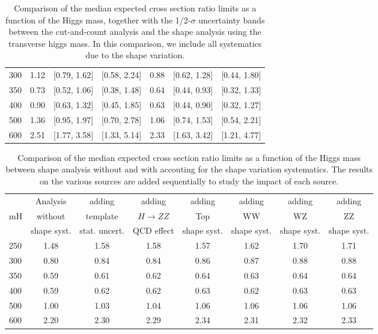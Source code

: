 \begin{table}[!ht]
\begin{center}
{\begin{tabular}{|l|c|c|c|c|c|c|}
300 & 1.12 & [0.79, 1.62] & [0.58, 2.24] & 0.88 & [0.62, 1.28] & [0.44, 1.80] \\
350 & 0.73 & [0.52, 1.06] & [0.38, 1.48] & 0.64 & [0.44, 0.93] & [0.32, 1.33] \\
400 & 0.90 & [0.63, 1.32] & [0.45, 1.85] & 0.63 & [0.44, 0.90] & [0.32, 1.27] \\
500 & 1.36 & [0.95, 1.97] & [0.70, 2.78] & 1.06 & [0.74, 1.53] & [0.54, 2.21]\\
600 & 2.51 & [1.77, 3.58] & [1.33, 5.14] & 2.33 & [1.63, 3.42] & [1.21, 4.77]\\
\hline
\end{tabular}
}
\caption{Comparison of the median expected cross section ratio limits as a function 
of the Higgs mass, together with the 1/2-$\sigma$ uncertainty bands between the cut-and-count 
analysis and the shape analysis using the transverse higgs mass. In this comparison, we include all systematics due to 
the shape variation. }
\label{tab:mva_mtshapevscuts_withshapevar_hzz}
\end{center}
\end{table}
\begin{table}[!ht]
\begin{center}
{\normalsize
\begin{tabular}{|l|c|cccccc|}
\hline
      &  Analysis    & adding          &  adding      &  adding      &  adding      & adding      & adding \\
mH  &  without     & template        &  $H\to ZZ$   &  Top         &  WW          & WZ          & ZZ \\
      &  shape syst. & stat. uncert.   &  QCD effect &  shape syst. &  shape syst. & shape syst. & shape syst. \\
\hline
250 & 1.48 & 1.58 & 1.58 & 1.57 & 1.62 & 1.70 & 1.71 \\
300 & 0.80 & 0.84 & 0.84 & 0.86 & 0.87 & 0.88 & 0.88 \\
350 & 0.59 & 0.61 & 0.62 & 0.64 & 0.63 & 0.64 & 0.64 \\
400 & 0.59 & 0.62 & 0.62 & 0.63 & 0.62 & 0.63 & 0.63 \\
500 & 1.00 & 1.03 & 1.04 & 1.06 & 1.06 & 1.06 & 1.06 \\
600 & 2.20 & 2.30 & 2.29 & 2.34 & 2.31 & 2.32 & 2.33 \\
\hline
\end{tabular}
}
\caption{Comparison of the median expected cross section ratio limits as a function 
of the Higgs mass between shape analysis without and with accouting for the 
shape variation systematics. The results on the various sources are added sequentially 
to study the impact of each source. }
\label{tab:mva_mtshape_detail}
\end{center}
\end{table}
